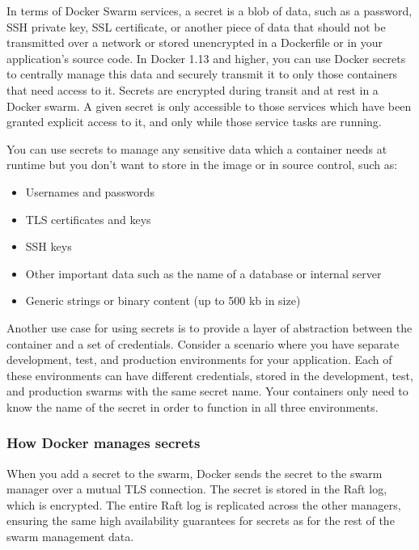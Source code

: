 \bigskip
{}


In terms of Docker Swarm services, a secret is a blob of data, such as a
password, SSH private key, SSL certificate, or another piece of data that
should not be transmitted over a network or stored unencrypted in a
Dockerfile or in your application’s source code. In Docker 1.13 and higher,
you can use Docker secrets to centrally manage this data and securely
transmit it to only those containers that need access to it. Secrets are
encrypted during transit and at rest in a Docker swarm. A given secret is
only accessible to those services which have been granted explicit access
to it, and only while those service tasks are running.

You can use secrets to manage any sensitive data which a container needs at
runtime but you don’t want to store in the image or in source control, such
as:

\begin{itemize}
\item Usernames and passwords
\item TLS certificates and keys
\item SSH keys
\item Other important data such as the name of a database or internal server
\item Generic strings or binary content (up to 500 kb in size)
\end{itemize}


Another use case for using secrets is to provide a layer of abstraction
between the container and a set of credentials. Consider a scenario where
you have separate development, test, and production environments for your
application. Each of these environments can have different credentials,
stored in the development, test, and production swarms with the same secret
name. Your containers only need to know the name of the secret in order to
function in all three environments.

\subsubsection{How Docker manages secrets}
When you add a secret to the swarm, Docker sends the secret to the swarm
manager over a mutual TLS connection. The secret is stored in the Raft log,
which is encrypted. The entire Raft log is replicated across the other
managers, ensuring the same high availability guarantees for secrets as for
the rest of the swarm management data.

